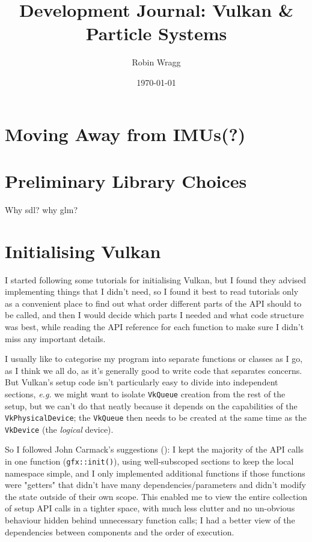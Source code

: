 \documentclass[11pt, a4paper, twocolumn]{article}
\title{\sffamily\bfseries Development Journal: Vulkan \& Particle Systems}
\author{Robin Wragg}
\date{\today}
\begin{document}
\maketitle

\section{Moving Away from IMUs(?)}

\section{Preliminary Library Choices}

Why sdl? why glm?

\section{Initialising Vulkan}

I started following some tutorials for initialising Vulkan, but I found they advised implementing things that I didn't need, so I found it best to read tutorials only as a convenient place to find out what order different parts of the API should to be called, and then I would decide which parts I needed and what code structure was best, while reading the API reference for each function to make sure I didn't miss any important details.

I usually like to categorise my program into separate functions or classes as I go, as I think we all do, as it's generally good to write code that separates concerns. But Vulkan's setup code isn't particularly easy to divide into independent sections, \emph{e.g.} we might want to isolate \verb|VkQueue| creation from the rest of the setup, but we can't do that neatly because it depends on the capabilities of the \verb|VkPhysicalDevice|; the \verb|VkQueue| then needs to be created at the same time as the \verb|VkDevice| (the \emph{logical} device).

So I followed John Carmack's suggestions (\citeyear{Carmack2007}): I kept the majority of the API calls in one function (\verb|gfx::init()|), using well-subscoped sections to keep the local namespace simple, and I only implemented additional functions if those functions were "getters" that didn't have many dependencies/parameters and didn't modify the state outside of their own scope. This enabled me to view the entire collection of setup API calls in a tighter space, with much less clutter and no un-obvious behaviour hidden behind unnecessary function calls; I had a better view of the dependencies between components and the order of execution.
\end{document}

